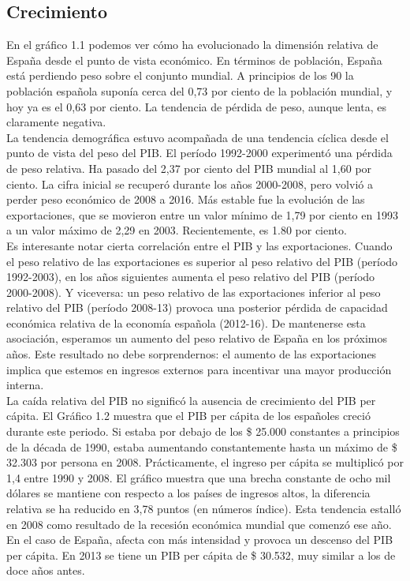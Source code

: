     \subsection{Crecimiento}
    En el gráfico 1.1 podemos ver cómo ha evolucionado la dimensión relativa de España desde el punto de vista económico. En términos de población, España está perdiendo peso sobre el conjunto mundial. A principios de los 90 la población española suponía cerca del 0,73 por ciento de la población mundial, y hoy ya es el 0,63 por ciento. La tendencia de pérdida de peso, aunque lenta, es claramente negativa.\\
    La tendencia demográfica estuvo acompañada de una tendencia cíclica desde el punto de vista del peso del PIB. El período 1992-2000 experimentó una pérdida de peso relativa. Ha pasado del 2,37 por ciento del PIB mundial al 1,60 por ciento. La cifra inicial se recuperó durante los años 2000-2008, pero volvió a perder peso económico de 2008 a 2016. Más estable fue la evolución de las exportaciones, que se movieron entre un valor mínimo de 1,79 por ciento en 1993 a un valor máximo de 2,29 en 2003. Recientemente, es 1.80 por ciento.\\
    Es interesante notar cierta correlación entre el PIB y las exportaciones. Cuando el peso relativo de las exportaciones es superior al peso relativo del PIB (período 1992-2003), en los años siguientes aumenta el peso relativo del PIB (período 2000-2008). Y viceversa: un peso relativo de las exportaciones inferior al peso relativo del PIB (período 2008-13) provoca una posterior pérdida de capacidad económica relativa de la economía española (2012-16). De mantenerse esta asociación, esperamos un aumento del peso relativo de España en los próximos años. Este resultado no debe sorprendernos: el aumento de las exportaciones implica que estemos en ingresos externos para incentivar una mayor producción interna.\\
    La caída relativa del PIB no significó la ausencia de crecimiento del PIB per cápita. El Gráfico 1.2 muestra que el PIB per cápita de los españoles creció durante este periodo. Si estaba por debajo de los \$ 25.000 constantes a principios de la década de 1990, estaba aumentando constantemente hasta un máximo de \$ 32.303 por persona en 2008. Prácticamente, el ingreso per cápita se multiplicó por 1,4 entre 1990 y 2008. El gráfico muestra que una brecha constante de ocho mil dólares se mantiene con respecto a los países de ingresos altos, la diferencia relativa se ha reducido en 3,78 puntos (en números índice). Esta tendencia estalló en 2008 como resultado de la recesión económica mundial que comenzó ese año. En el caso de España, afecta con más intensidad y provoca un descenso del PIB per cápita. En 2013 se tiene un PIB per cápita de \$ 30.532, muy similar a los de doce años antes.\\
